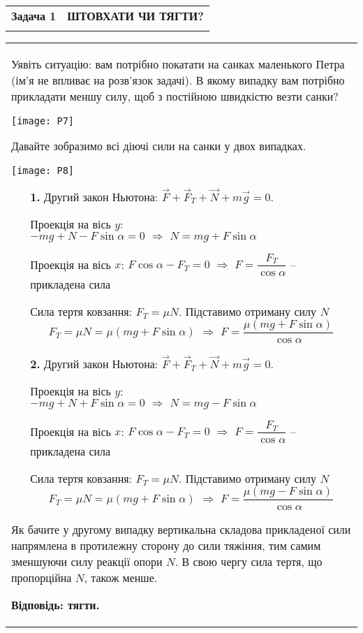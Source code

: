 \documentclass[a4paper,12pt]{article}
\newenvironment{eeprob}[3]
{
\begin{table}[!h]
\setlength{\arrayrulewidth}{1.pt}
\arrayrulecolor[HTML]{EFA72D}
\begin{tabularx}{\textwidth}{|c X}
\cellcolor[HTML]{EFA72D} \color{white}\textbf{Задача #1}& \textbf{#2} \\ 
& 
\end{tabularx}
\end{table}
\vspace{-1.2cm}
\begin{table}[!h]
\setlength{\arrayrulewidth}{1.pt}
\arrayrulecolor[HTML]{EFA72D}
\begin{tabularx}{\textwidth}{|X}
#3 \\ 
\end{tabularx}
\end{table}
}
{\arrayrulecolor{black}}
\begin{document}
\begin{eeprob}{1}{ШТОВХАТИ ЧИ ТЯГТИ?}{Уявіть ситуацію: вам потрібно покатати на санках маленького Петра (ім'я не впливає на розв'язок задачі). В якому випадку вам потрібно прикладати меншу силу, щоб з постійною швидкістю везти санки? \begin{center}\texttt{[image: P7]}\end{center} Давайте зобразимо всі діючі сили на санки у двох випадках. \begin{center}\texttt{[image: P8]}\end{center} \begin{itemize} \item[\textbf{1.}] Другий закон Ньютона: $\vec{F} + \vec{F}_T + \vec{N} + m\vec{g} = 0$. 

Проекція на вісь $y$: $-mg + N - F\sin \alpha = 0\,\,\Rightarrow\,\, \boxed{N = mg +  F\sin \alpha}$


Проекція на вісь $x$: $F\cos \alpha - F_T = 0\,\,\Rightarrow\,\,F = \dfrac{F_T}{\cos\alpha}$ – прикладена сила

Сила тертя ковзання: $F_T = \mu N$. Підставимо отриману силу $N$ $$F_T = \mu N = \mu (mg + F\sin\alpha)\,\,\Rightarrow\,\,\boxed{F = \dfrac{\mu (mg + F\sin\alpha)}{\cos \alpha}}$$ 

\item[\textbf{2.}] Другий закон Ньютона: $\vec{F} + \vec{F}_T + \vec{N} + m\vec{g} = 0$. 

Проекція на вісь $y$: $-mg + N + F\sin \alpha = 0\,\,\Rightarrow\,\, \boxed{N = mg -  F\sin \alpha}$


Проекція на вісь $x$: $F\cos \alpha - F_T = 0\,\,\Rightarrow\,\,F = \dfrac{F_T}{\cos\alpha}$ – прикладена сила

Сила тертя ковзання: $F_T = \mu N$. Підставимо отриману силу $N$ $$F_T = \mu N = \mu (mg + F\sin\alpha)\,\,\Rightarrow\,\,\boxed{F = \dfrac{\mu (mg - F\sin\alpha)}{\cos \alpha}}$$
\end{itemize} Як бачите у другому випадку вертикальна складова прикладеної сили напрямлена в протилежну сторону до сили тяжіння, тим самим зменшуючи силу реакції опори $N$. В свою чергу сила тертя, що пропорційна $N$, також менше. \newline

\textbf{Відповідь: тягти.}}\end{eeprob}
\newpage
\end{document}
